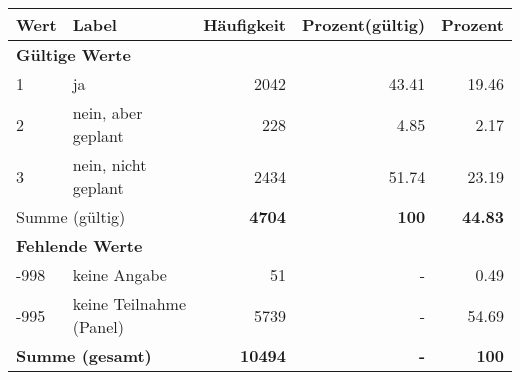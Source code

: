      \begin{longtable}{lXrrr}
     \toprule
     \textbf{Wert} & \textbf{Label} & \textbf{Häufigkeit} & \textbf{Prozent(gültig)} & \textbf{Prozent} \\
     \endhead
     \midrule
     \multicolumn{5}{l}{\textbf{Gültige Werte}}\\

     1 &
     \multicolumn{1}{X}{ ja   } &


       \num{2042} &
       \num[round-mode=places,round-precision=2]{43.41} &
         \num[round-mode=places,round-precision=2]{19.46} \\

     2 &
     \multicolumn{1}{X}{ nein, aber geplant   } &


       \num{228} &
       \num[round-mode=places,round-precision=2]{4.85} &
         \num[round-mode=places,round-precision=2]{2.17} \\

     3 &
     \multicolumn{1}{X}{ nein, nicht geplant   } &


       \num{2434} &
       \num[round-mode=places,round-precision=2]{51.74} &
         \num[round-mode=places,round-precision=2]{23.19} \\
     \midrule
     \multicolumn{2}{l}{Summe (gültig)} &
       \textbf{\num{4704}} &
     \textbf{\num{100}} &
       \textbf{\num[round-mode=places,round-precision=2]{44.83}} \\
     \multicolumn{5}{l}{\textbf{Fehlende Werte}}\\
       -998 &
       keine Angabe &
         \num{51} &
        - &
         \num[round-mode=places,round-precision=2]{0.49} \\
       -995 &
       keine Teilnahme (Panel) &
         \num{5739} &
        - &
         \num[round-mode=places,round-precision=2]{54.69} \\
     \midrule
     \multicolumn{2}{l}{\textbf{Summe (gesamt)}} &
          \textbf{\num{10494}} &
        \textbf{-} &
        \textbf{\num{100}} \\
     \bottomrule
     \end{longtable}
     

